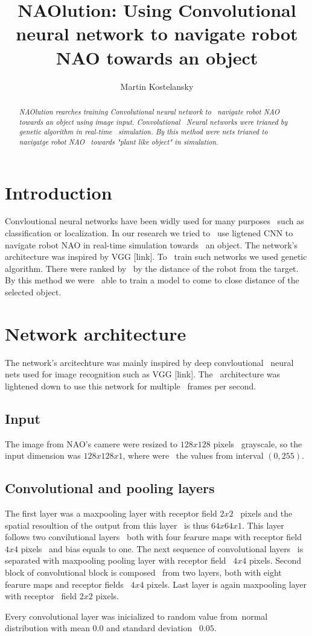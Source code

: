 \documentclass[twocolumn,10pt]{asme2ej}
\title{NAOlution: Using Convolutional neural network to navigate robot NAO towards an object}
\author{Martin Kostelansky
    \affiliation{
	Faculty of Informaion Technology\\
	Czech Technical University\\
	Prague, Czechia\\
    Email: kostema3@fit.cvut.cz
    }	
}
\begin{document}
\maketitle
\begin{abstract}
{\it NAOlution rearches training Convolutional neural network to \
navigate robot NAO towards an object using image input. Convolutional \
Neural networks were trianed by genetic algorithm in real-time \
simulation. By this method were nets trianed to navigatge robot NAO \
towards "plant like object" in simulation.}

\end{abstract}

\section{Introduction}
Convloutional neural networks have been widly used for many purposes \
such as classification or localization. In our research we tried to \
use ligtened CNN to navigate robot NAO in real-time simulation towards \
an object. The network's architecture was inspired by VGG [link]. To \
train such networks we used genetic algorithm. There were ranked by \ 
by the distance of the robot from the target. By this method we were \
able to train a model to come to close distance of the selected object.

\section{Network architecture}
The network's arcitechture was mainly inspired by deep convloutional \
neural nets used for image recognition such as VGG [link]. The \
architecture was lightened down to use this network for multiple \
frames per second.
\subsection{Input}
The image from NAO's camere were resized to $128x128$ pixels \
grayscale, so the input dimension was $128x128x1$, where were \
the values from interval $(0,255)$.
\subsection{Convolutional and pooling layers}
The first layer was a maxpooling layer with receptor field $2x2$ \
pixels and the spatial resoultion of the output from this layer \
is thus $64x64x1$. This layer follows two convilutional layers \
both with four fearure maps with receptor field $4x4$ pixels \
and bias equals to one. The next sequence of convolutional layers \
is separated with maxpooling pooling layer with receptor field \
$4x4$ pixels. Second block of convolutional block is composed \
from two layers, both with eight fearure maps and receptor fields \
$4x4$ pixels. Last layer is again maxpooling layer with receptor \
field $2x2$ pixels.
\par Every convolutional layer was inicialized to random value from\
normal distribution with mean $0.0$ and standard deviation \
$0.05$.
\end{document}
